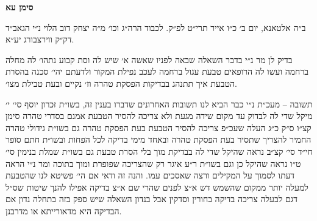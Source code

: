 \documentclass[12pt, openany]{book}
\newcommand{\chapname}{}
\newcommand{\newchap}[1]{
	\addcontentsline{toc}{chapter}{#1}
	\renewcommand{\chapname}{#1}
		\begin{center}
			\textbf{%
\fontsize{16pt}{16pt}\selectfont
				#1}
		\end{center}
}
\begin{document}
\newchap{סימן עא}
\begin{multicols}{2}
ב״ה אלטאנא, יום ב׳ כ״ו אייר תרי״ט לפ״ק. לכבוד הרה״ג וכו׳ מ״ה יצחק דוב הלוי נ״י הגאב״ד דק״ק ווירצבורג יע״א.\\\vspace{0pt}

בדיק לן מר נ״י בדבר השאלה שבאה לפניו שאשה א׳ שיש לה וסת קבוע נתהו׳ לה מחלה ברחמה ועשו לה הרופאים טבעת עגול ברחמה לעכב נפילת המקור ולדעתם יהי׳ סכנה בהסרת הטבעת איך תתנהג בבדיקות הפסקת טהרה וז׳ נקיים ובעת טבילת מצו׳.\\\vspace{0pt}

תשובה – מעכ״ת נ״י כבר הביא לנו תשובות האחרונים שדברו בענין זה, בשו״ת זכרון יוסף סי׳ י׳ מיקל שדי לה לבדוק עד מקום שידה מגעת ולא צריכה להסיר הטבעת אמנם בסדרי טהרה סימן קצ״ו ס״ק כ״ג העלה שעכ״פ צריכה להסיר הטבעת בעת הפסקת טהרה גם בשו״ת גידולי טהרה החמיר להצריך שתסיר בעת הפסקת טהרה ובאחד מימי בדיקה לכל הפחות ובשו״ת חתם סופר חי״ד סי׳ קצ״ב נראה שהיקל שדי לה בבדיקת מוך בלי הסרת טבעת גם בשו״ת שמלת בנימין סי׳ ט״ו נראה שהיקל כן וגם בשו״ת ר״ע איגר רק שהצריכה שפופרת ומוך בתוכה ומר נ״י הראה דעתו לסמוך על המקילים ורצה שאסכים עמו. והנה זה ודאי אם הי׳ פשיטא לנו שהטבעת למעלה יותר ממקום שהשמש דש א״צ לפנים שהרי שם א״צ בדיקה אפילו להנך שיטות שס״ל דגם לבעלה צריכה בדיקה בחורין וסדקין אבל בנדון השאלה שיש ספק בזה בתחלה נדון אם הבדיקה היא מדאורייתא או מדרבנן.\\\vspace{0pt}


\end{multicols}
\end{document}
